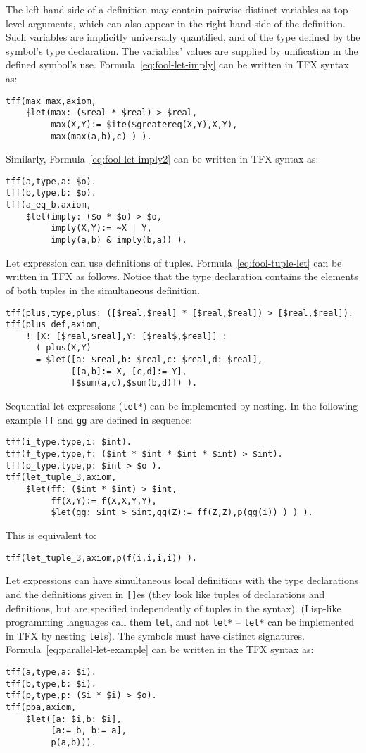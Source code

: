 \documentclass{easychair}
\begin{document}
The left hand side of a definition may contain pairwise distinct variables 
as top-level arguments, which can also appear in the right hand side
of the definition.
Such variables are implicitly universally quantified, and of the type 
defined by the symbol's type declaration.
The variables' values are supplied by unification in the defined symbol's use. 
Formula~\ref{eq:fool-let-imply} can be written in TFX syntax as:
\begin{verbatim}
tff(max_max,axiom,
    $let(max: ($real * $real) > $real,
         max(X,Y):= $ite($greatereq(X,Y),X,Y),
         max(max(a,b),c) ) ).
\end{verbatim}

Similarly, Formula~\ref{eq:fool-let-imply2} can be written in TFX syntax as:
\begin{verbatim}
tff(a,type,a: $o).
tff(b,type,b: $o).
tff(a_eq_b,axiom,
    $let(imply: ($o * $o) > $o,
         imply(X,Y):= ~X | Y,
         imply(a,b) & imply(b,a)) ).
\end{verbatim}

Let expression can use definitions of tuples. 
Formula~\ref{eq:fool-tuple-let} can be written in TFX as follows. 
Notice that the type declaration contains the elements of both tuples in 
the simultaneous definition.
\begin{verbatim}
tff(plus,type,plus: ([$real,$real] * [$real,$real]) > [$real,$real]).
tff(plus_def,axiom,
    ! [X: [$real,$real],Y: [$real$,$real]] :
      ( plus(X,Y) 
      = $let([a: $real,b: $real,c: $real,d: $real],
             [[a,b]:= X, [c,d]:= Y],
             [$sum(a,c),$sum(b,d)]) ).
\end{verbatim}

Sequential let expressions (\verb'let*') can be implemented by nesting. 
In the following example {\tt ff} and {\tt gg} are defined in sequence:
\begin{verbatim}
tff(i_type,type,i: $int).
tff(f_type,type,f: ($int * $int * $int * $int) > $int).
tff(p_type,type,p: $int > $o ).
tff(let_tuple_3,axiom,
    $let(ff: ($int * $int) > $int,
         ff(X,Y):= f(X,X,Y,Y),
         $let(gg: $int > $int,gg(Z):= ff(Z,Z),p(gg(i)) ) ) ).
\end{verbatim}
This is equivalent to:
\begin{verbatim}
tff(let_tuple_3,axiom,p(f(i,i,i,i)) ).
\end{verbatim}

Let expressions can have simultaneous local definitions
with the type declarations and the definitions given in {\tt []}es
(they look like tuples of declarations and definitions, but are
specified independently of tuples in the syntax).
(Lisp-like programming languages call them \verb'let', and 
not \verb'let*' -- \verb'let*' can be implemented in TFX by nesting
\verb'let's).
The symbols must have distinct signatures.
Formula~\ref{eq:parallel-let-example} can be written in the TFX syntax as:
\begin{verbatim}
tff(a,type,a: $i).
tff(b,type,b: $i).
tff(p,type,p: ($i * $i) > $o).
tff(pba,axiom,
    $let([a: $i,b: $i],
         [a:= b, b:= a],
         p(a,b))).
\end{verbatim}
\end{document}
